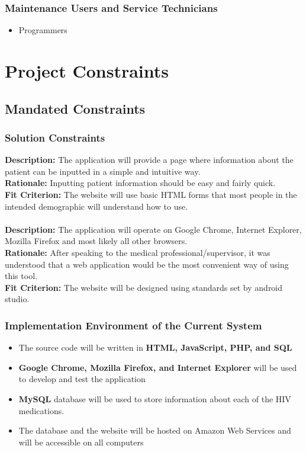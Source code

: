 \documentclass[12pt]{article}
\begin{document}
\subsubsection{Maintenance Users and Service Technicians}
\begin{itemize}
\item Programmers
\end{itemize}

\section{Project Constraints}
\setcounter{subsection}{3}
\subsection{Mandated Constraints }
\subsubsection{Solution Constraints}
{\bf Description:} The application will provide a page where information about the patient can be inputted in a simple and intuitive way.\\
{\bf Rationale:} Inputting patient information should be easy and fairly quick.\\
{\bf Fit Criterion:} The website will use basic HTML forms that most people in the intended demographic will understand how to use.\\ \\
{\bf Description:} The application will operate on Google Chrome, Internet Explorer, Mozilla Firefox and most likely all other browsers.\\
{\bf Rationale:} After speaking to the medical professional/supervisor, it was understood that a web application would be the most convenient way of using this tool.\\
{\bf Fit Criterion:} The website will be designed using standards set by android studio.

\subsubsection{Implementation Environment of the Current System}
\begin{itemize}
\item The source code will be written in {\bf HTML, JavaScript, PHP, and SQL}
\item {\bf Google Chrome, Mozilla Firefox, and Internet Explorer} will be used to develop and test the application
\item {\bf MySQL} database will be used to store information about each of the HIV medications.
\item  The database and the website will be hosted on Amazon Web Services and will be accessible on all computers
\end{itemize}
\end{document}
